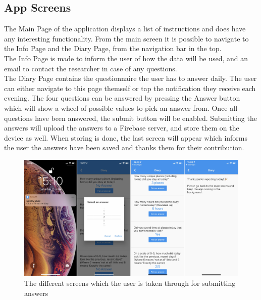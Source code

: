 \subsection{App Screens}
The Main Page of the application displays a list of instructions and does have any interesting functionality. From the main screen it is possible to navigate to the Info Page and the Diary Page, from the navigation bar in the top.\\

The Info Page is made to inform the user of how the data will be used, and an email to contact the researcher in case of any questions.\\

The Diary Page contains the questionnaire the user has to answer daily. The user can either navigate to this page themself or tap the notification they receive each evening. The four questions can be answered by pressing the Answer button which will show a wheel of possible values to pick an answer from. Once all questions have been answered, the submit button will be enabled. Submitting the answers will upload the answers to a Firebase server, and store them on the device as well. When storing is done, the last screen will appear which informs the user the answers have been saved and thanks them for their contribution.

\begin{figure}
    \centering
    \includegraphics[width=\textwidth]{images/app_imgs/screens-answers.pdf}
    \caption{The different screens which the user is taken through for submitting answers}
    \label{fig:screens-answers}
\end{figure}

